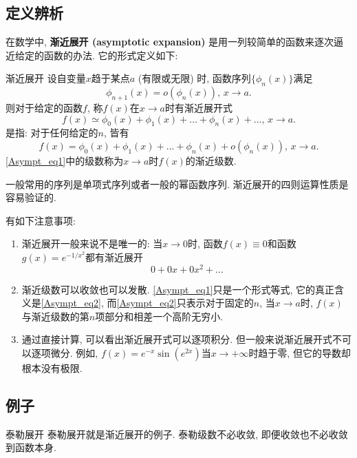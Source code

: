 
\subsection{定义辨析}
在数学中, \textbf{渐近展开 (asymptotic expansion)} 是用一列较简单的函数来逐次逼近给定的函数的办法. 它的形式定义如下:

\begin{definition}{渐近展开}
设自变量$x$趋于某点$a$ (有限或无限) 时, 函数序列$\{\phi_{n}(x)\}$满足
$$
\phi_{n+1}(x)=o(\phi_n(x)),\,x\to a.
$$
则对于给定的函数$f$, 称$f(x)$在$x\to a$时有渐近展开式
\begin{equation}\label{Asympt_eq1}
f(x)\simeq\phi_0(x)+\phi_1(x)+...+\phi_n(x)+...,\,x\to a.
\end{equation}
是指: 对于任何给定的$n$, 皆有
\begin{equation}\label{Asympt_eq2}
f(x)=\phi_0(x)+\phi_1(x)+...+\phi_n(x)+o(\phi_n(x)),\,x\to a.
\end{equation}
\autoref{Asympt_eq1}中的级数称为$x\to a$时$f(x)$的渐近级数.
\end{definition}

一般常用的序列是单项式序列或者一般的幂函数序列. 渐近展开的四则运算性质是容易验证的.

有如下注意事项:
\begin{enumerate}
\item 渐近展开一般来说不是唯一的: 当$x\to0$时, 函数$f(x)\equiv 0$和函数$g(x)=e^{-1/x^2}$都有渐近展开
$$
0+0x+0x^2+...
$$

\item 渐近级数可以收敛也可以发散. \autoref{Asympt_eq1}只是一个形式等式, 它的真正含义是\autoref{Asympt_eq2}, 而\autoref{Asympt_eq2}只表示对于固定的$n$, 当$x\to a$时, $f(x)$与渐近级数的第$n$项部分和相差一个高阶无穷小. 

\item 通过直接计算, 可以看出渐近展开式可以逐项积分. 但一般来说渐近展开式不可以逐项微分. 例如, $f(x)=e^{-x}\sin(e^{2x})$当$x\to+\infty$时趋于零, 但它的导数却根本没有极限.
\end{enumerate}

\subsection{例子}
\begin{example}{泰勒展开}
泰勒展开就是渐近展开的例子. 泰勒级数不必收敛, 即便收敛也不必收敛到函数本身.
\end{example}

